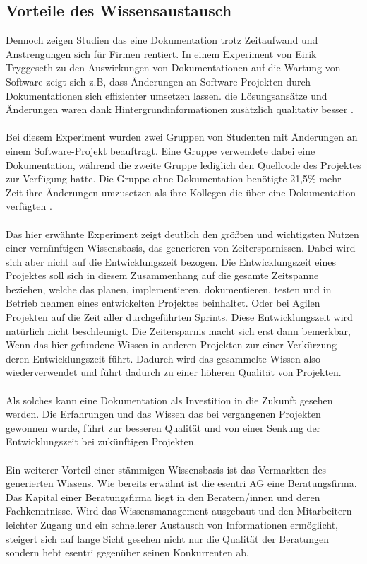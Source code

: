 \documentclass[a4paper,12pt]{scrartcl}
\begin{document}
\subsection{Vorteile des Wissensaustausch}
\label{Zeitersparnis}
Dennoch zeigen Studien das eine Dokumentation trotz Zeitaufwand und Anstrengungen sich für Firmen rentiert. In einem Experiment von Eirik Tryggeseth zu den Auswirkungen von Dokumentationen auf die Wartung von Software zeigt sich z.B, dass Änderungen an Software Projekten durch Dokumentationen sich effizienter umsetzen lassen. die Lösungsansätze und Änderungen waren dank Hintergrundinformationen zusätzlich qualitativ besser \cite{Tryggeseth1997}.
\\\\
Bei diesem Experiment wurden zwei Gruppen von Studenten mit Änderungen an einem Software-Projekt beauftragt. Eine Gruppe verwendete dabei eine Dokumentation, während die zweite Gruppe lediglich den Quellcode des Projektes zur Verfügung hatte. Die Gruppe ohne Dokumentation benötigte 21,5\% mehr Zeit ihre Änderungen umzusetzen als ihre Kollegen die über eine Dokumentation verfügten \cite{Tryggeseth1997}.
\\\\
Das hier erwähnte Experiment zeigt deutlich den größten und wichtigsten Nutzen einer vernünftigen Wissensbasis, das generieren von Zeitersparnissen. Dabei wird sich aber nicht auf die Entwicklungszeit bezogen. Die Entwicklungszeit eines Projektes soll sich in diesem Zusammenhang auf die gesamte Zeitspanne beziehen, welche das planen, implementieren, dokumentieren, testen und in Betrieb nehmen eines entwickelten Projektes beinhaltet. Oder bei Agilen Projekten auf die Zeit aller durchgeführten Sprints. Diese Entwicklungszeit wird natürlich nicht beschleunigt. Die Zeitersparnis macht sich erst dann bemerkbar, Wenn das hier gefundene Wissen in anderen Projekten zur einer Verkürzung deren Entwicklungszeit führt. Dadurch wird das gesammelte Wissen also wiederverwendet und führt dadurch zu einer höheren Qualität von Projekten.
\\\\
Als solches kann eine Dokumentation als Investition in die Zukunft gesehen werden. Die Erfahrungen und das Wissen das bei vergangenen Projekten gewonnen wurde, führt zur besseren Qualität und von einer Senkung der Entwicklungszeit bei zukünftigen Projekten.
\\\\
Ein weiterer Vorteil einer stämmigen Wissensbasis ist das Vermarkten des generierten Wissens. Wie bereits erwähnt ist die esentri AG eine Beratungsfirma. Das Kapital einer Beratungsfirma liegt in den Beratern/innen und deren Fachkenntnisse. Wird das Wissensmanagement ausgebaut und den Mitarbeitern leichter Zugang und ein schnellerer Austausch von Informationen ermöglicht, steigert sich auf lange Sicht gesehen nicht nur die Qualität der Beratungen sondern hebt esentri gegenüber seinen Konkurrenten ab.
\end{document}
